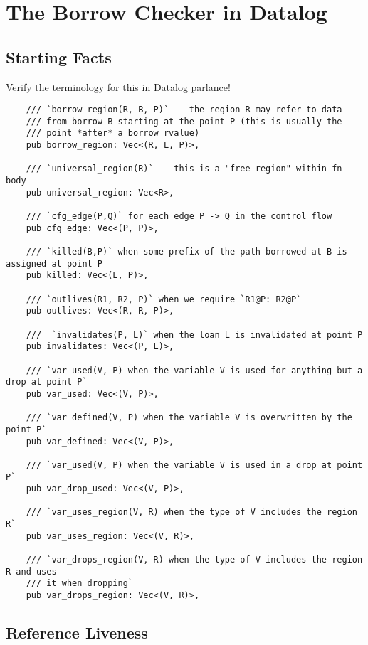 \documentclass{UUThesisTemplate}
\newcommand{\fixme}[1] {{\color{red}#1}}
\begin{document}
\section{The Borrow Checker in Datalog}


\subsection{Starting Facts}
\label{sec:input-facts}
\fixme{Verify the terminology for this in Datalog parlance!}

\begin{verbatim}
    /// `borrow_region(R, B, P)` -- the region R may refer to data
    /// from borrow B starting at the point P (this is usually the
    /// point *after* a borrow rvalue)
    pub borrow_region: Vec<(R, L, P)>,

    /// `universal_region(R)` -- this is a "free region" within fn body
    pub universal_region: Vec<R>,

    /// `cfg_edge(P,Q)` for each edge P -> Q in the control flow
    pub cfg_edge: Vec<(P, P)>,

    /// `killed(B,P)` when some prefix of the path borrowed at B is assigned at point P
    pub killed: Vec<(L, P)>,

    /// `outlives(R1, R2, P)` when we require `R1@P: R2@P`
    pub outlives: Vec<(R, R, P)>,

    ///  `invalidates(P, L)` when the loan L is invalidated at point P
    pub invalidates: Vec<(P, L)>,

    /// `var_used(V, P) when the variable V is used for anything but a drop at point P`
    pub var_used: Vec<(V, P)>,

    /// `var_defined(V, P) when the variable V is overwritten by the point P`
    pub var_defined: Vec<(V, P)>,

    /// `var_used(V, P) when the variable V is used in a drop at point P`
    pub var_drop_used: Vec<(V, P)>,

    /// `var_uses_region(V, R) when the type of V includes the region R`
    pub var_uses_region: Vec<(V, R)>,

    /// `var_drops_region(V, R) when the type of V includes the region R and uses
    /// it when dropping`
    pub var_drops_region: Vec<(V, R)>,
\end{verbatim}

\subsection{Reference Liveness}
\label{sec:var-livenes}
\end{document}
